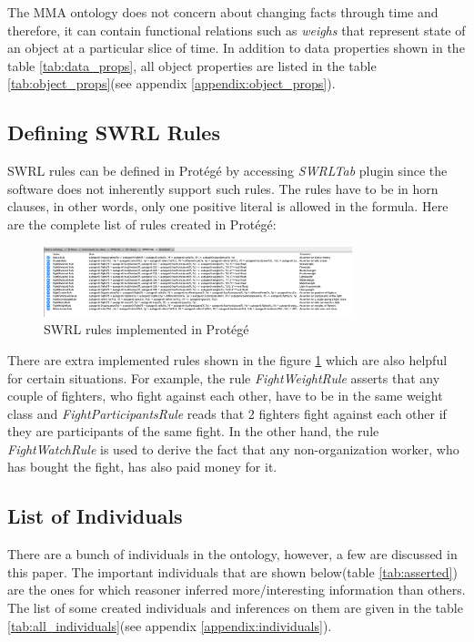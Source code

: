 \documentclass[a4paper]{article}
\begin{document}
The MMA ontology does not concern about changing facts through time and therefore, it can contain functional relations such as \textit{weighs} that represent state of an object at a particular slice of time. 
In addition to data properties shown in the table \ref{tab:data_props}, all object properties are listed in the table \ref{tab:object_props}(see appendix \ref{appendix:object_props}).

\subsection{Defining SWRL Rules}
SWRL rules can be defined in Prot\'eg\'e by accessing \textit{SWRLTab} plugin since the software does not inherently support such rules. The rules have to be in horn clauses, in other words, 
only one positive literal is allowed in the formula. Here are the complete list of rules created in Prot\'eg\'e:

\begin{figure}[H]
	\centering
	\includegraphics[width=0.8\textwidth]{resources/swrl_rules.png}
	\caption{SWRL rules implemented in Prot\'eg\'e}
	\label{fig:swrl_rules_protege}
\end{figure}

There are extra implemented rules shown in the figure \ref{fig:swrl_rules_protege} which are also helpful for certain situations. For example, the rule \textit{FightWeightRule} asserts that any 
couple of fighters, who fight against each other, have to be in the same weight class and \textit{FightParticipantsRule} reads that 2 fighters fight against each other if they are participants 
of the same fight. In the other hand, the rule \textit{FightWatchRule} is used to derive the fact that any non-organization worker, who has bought the fight, has also paid money for it.

\subsection{List of Individuals}
There are a bunch of individuals in the ontology, however, a few are discussed in this paper. The important individuals that are shown below(table \ref{tab:asserted}) are the ones for which 
reasoner inferred more/interesting information than others. The list of some created individuals and inferences on them are given in the table \ref{tab:all_individuals}(see appendix \ref{appendix:individuals}).
\end{document}
